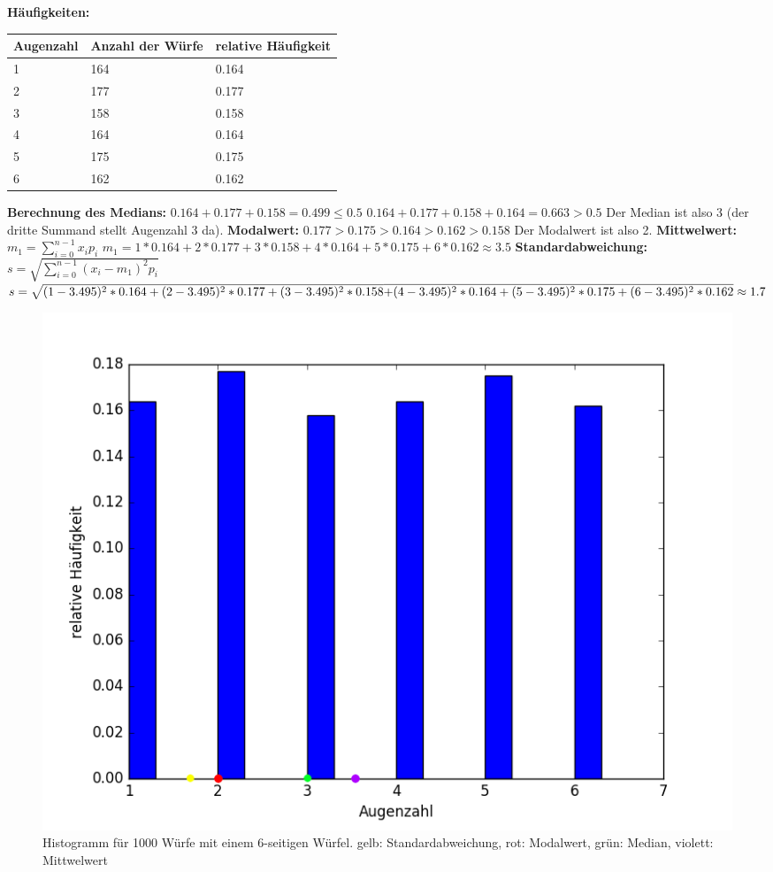 \documentclass[fleqn,a4paper,12pt]{article}
\begin{document}
	\textbf{Häufigkeiten:}
	\begin{center}
		\begin{tabular}{ | l | l | l | }
			\hline
			Augenzahl & Anzahl der Würfe & relative Häufigkeit \\ \hline
			1 & 164 & 0.164 \\ \hline
			2 & 177 & 0.177 \\ \hline
			3 & 158 & 0.158 \\ \hline
			4 & 164 & 0.164 \\ \hline
			5 & 175 & 0.175 \\ \hline
			6 & 162 & 0.162 \\ \hline
		\end{tabular}  
	\end{center}
	\textbf{Berechnung des Medians:} \newline
	$0.164 + 0.177 + 0.158 = 0.499 \leq 0.5$ \newline
	$0.164 + 0.177 + 0.158 + 0.164 = 0.663 > 0.5$ \newline
	Der Median ist also 3 (der dritte Summand stellt Augenzahl 3 da). \newline
	\textbf{Modalwert:} \newline
	$0.177 > 0.175 > 0.164 > 0.162 > 0.158$ \newline
	Der Modalwert ist also 2. \newline
	\textbf{Mittwelwert:} \newline 
	$m_1 = \sum_{i=0}^{n-1} x_i p_i$ \newline
	$m_1 = 1*0.164 + 2*0.177 + 3*0.158 + 4*0.164 + 5*0.175 + 6*0.162 \approx 3.5$ \newline
	\textbf{Standardabweichung:} \newline
	$s = \sqrt{\sum_{i=0}^{n-1} (x_i-m_1)^2 p_i}$ \newline
	$s = \sqrt{(1-3.495)^2*0.164 + (2-3.495)^2*0.177 + (3-3.495)^2*0.158} \\\overline{+ (4-3.495)^2*0.164 + (5-3.495)^2*0.175 + (6-3.495)^2*0.162} \approx 1.7$ \newpage
	\begin{figure}
		\includegraphics[width=1.0\textwidth]{A03_histo.png}
		\caption{Histogramm für 1000 Würfe mit einem 6-seitigen Würfel. \newline gelb: Standardabweichung, rot: Modalwert, grün: Median, violett: Mittwelwert}
	\end{figure}
\end{document}
